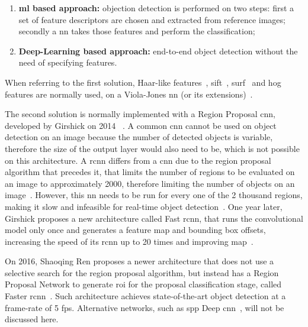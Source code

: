 \begin{enumerate}
	\item \textbf{\acl{ml} based approach:} objection detection is performed on two steps: first a set of feature descriptors are chosen and extracted from reference images; secondly a \acl{nn} takes those features and perform the classification;
	\item \textbf{Deep-Learning based approach:} end-to-end object detection without the need of specifying features.
\end{enumerate}

When referring to the first solution, Haar-like features~\cite{Messom2006}, \ac{sift}~\cite{Hughes2011a}, \ac{surf}~\cite{Bay2008} and \ac{hog}~\cite{Dalal2010, Surasak2018} features are normally used, on a Viola-Jones \ac{nn} (or its extensions)~\cite{Viola2001, ViolaP2004}. %

The second solution is normally implemented with a Region Proposal \acf{cnn}, developed by Girshick on 2014 \etal~\cite{Girshick2014}. A common \ac{cnn} cannot be used on object detection on an image because the number of detected objects is variable, therefore the size of the output layer would also need to be, which is not possible on this architecture. A \ac{rcnn} differs from a \ac{cnn} due to the region proposal algorithm that precedes it, that limits the number of regions to be evaluated on an image to approximately 2000, therefore limiting the number of objects on an image~\cite{Girshick2014}. However, this \acl{nn} needs to be run for every one of the 2 thousand regions, making it slow and infeasible for real-time object detection~\cite{Girshick2014}. One year later, Girshick proposes a new architecture called Fast \ac{rcnn}, that runs the convolutional model only once and generates a feature map and bounding box offsets, increasing the speed of its \ac{rcnn} up to 20 times and improving \ac{map}~\cite{Girshick2015}. 

On 2016, Shaoqing Ren \etal proposes a newer architecture that does not use a selective search for the region proposal algorithm, but instead has a Region Proposal Network to generate \ac{roi} for the proposal classification stage, called Faster \ac{rcnn}~\cite{Ren2017}. Such architecture achieves state-of-the-art object detection at a frame-rate of 5 \ac{fps}. Alternative networks, such as \ac{spp} Deep \acl{cnn}~\cite{He2015}, will not be discussed here.

